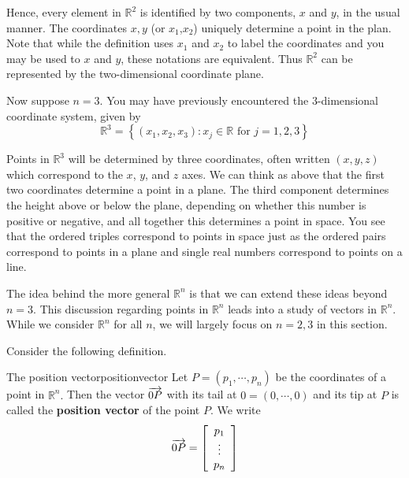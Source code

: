 Hence, every element in $\mathbb{R}^2$ is identified by two
components, $x$ and $y$, in the usual manner. The coordinates $x, y$ (or $x_1$,$x_2$) uniquely determine a point in the plan. Note that while the definition uses $x_1$ and $x_2$ to label the coordinates and you may be used to $x$ and $y$, these notations are equivalent. Thus $\mathbb{R}^2$ can be represented by the two-dimensional coordinate plane.

Now suppose $n=3$. You may have previously encountered the $3$-dimensional
coordinate system, given by
\begin{equation*}
\mathbb{R}^{3}=
\left\{ \left( x_{1}, x_{2}, x_{3}\right)
:x_{j}\in \mathbb{R}\text{ for }j=1,2,3 \right\}
\end{equation*}

Points in $\mathbb{R}^3$ will be determined by three
coordinates, often written $\left(x,y,z\right)$ which correspond to the $x$, $y$,
and $z$ axes.  We can think as above that the first two coordinates
determine a point in a plane. The third component determines the
height above or below the plane, depending on whether this number is
positive or negative, and all together this determines a point in
space. You
see that the ordered triples correspond to points in space just as the
ordered pairs correspond to points in a plane and single real numbers
correspond to points on a line.

The idea behind the more general $\mathbb{R}^n$ is that we can extend
these ideas beyond $n = 3.$ This discussion regarding points in $\mathbb{R}^n$ leads into a study of vectors in $\mathbb{R}^n$. While we consider $\mathbb{R}^n$ for all $n$,
we will largely  focus on $n=2,3$ in this section. 

Consider the following definition.

\begin{definition}{The position vector}{positionvector}
Let $P=\left( p_{1},\cdots ,p_{n}\right) $ be the coordinates of a
point in $\mathbb{R}^{n}.$ Then the vector $\overrightarrow{0P}$ with its tail at
$0=\left( 0,\cdots ,0\right) $ and its tip at 
$P$ is called the \textbf{position vector} of the point $P$. 
We write 
\begin{equation*}
\overrightarrow{0P} = \left[ 
\begin{array}{c}
p_{1} \\
\vdots \\
p_{n}
\end{array} \right]
\end{equation*}
\end{definition}

